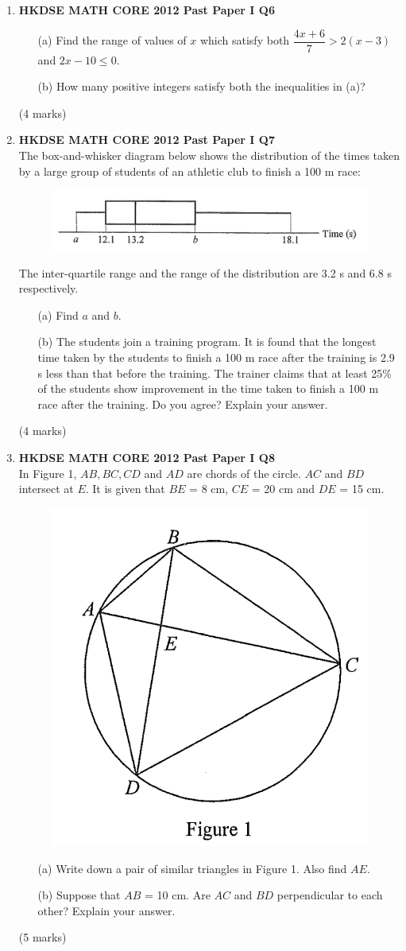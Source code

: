 \documentclass[12pt]{article}
\begin{document}
\begin{enumerate}
	\item \textbf{HKDSE MATH CORE 2012 Past Paper I Q6}
	\begin{enumerate}
		\item [(a)] Find the range of values of $x$ which satisfy both $\dfrac{4x+6}{7} > 2(x-3)$ and $2x - 10\leq 0$.
		\item [(b)] How many positive integers satisfy both the inequalities in (a)?
	\end{enumerate}	
	(4 marks)

	\item \textbf{HKDSE MATH CORE 2012 Past Paper I Q7}\\
	The box-and-whisker diagram below shows the distribution of the times taken by a large group of students of an athletic club to finish a 100 m race:
	\begin{figure}[H]
		\centering
		\includegraphics[width = .5\linewidth]{2012Figure1.0}
	\end{figure}
	The inter-quartile range and the range of the distribution are 3.2 s and 6.8 s respectively.
	\begin{enumerate}
		\item [(a)] Find $a$ and $b$.
		\item [(b)] The students join a training program. It is found that the longest time taken by the students to finish a 100 m race after the training is 2.9 s less than that before the training. The trainer claims that at least 25\% of the students show improvement in the time taken to finish a 100 m race after the training. Do you agree? Explain your answer.
	\end{enumerate}
	(4 marks)

	\item \textbf{HKDSE MATH CORE 2012 Past Paper I Q8}\\
	In Figure 1, $AB, BC, CD$ and $AD$ are chords of the circle. $AC$ and $BD$ intersect at $E$. It is given that $BE$ = 8 cm, $CE$ = 20 cm and $DE$ = 15 cm.
	\begin{figure}[H]
		\centering
		\includegraphics[width = .3
		\linewidth]{2012Figure1.1}
	\end{figure}
	\begin{enumerate}
		\item[(a)]Write down a pair of similar triangles in Figure 1. Also find $AE$.
		\item[(b)] Suppose that $AB$ = 10 cm. Are $AC$ and $BD$ perpendicular to each other? Explain your answer.
	\end{enumerate}
	(5 marks)



\end{enumerate}
\end{document}
